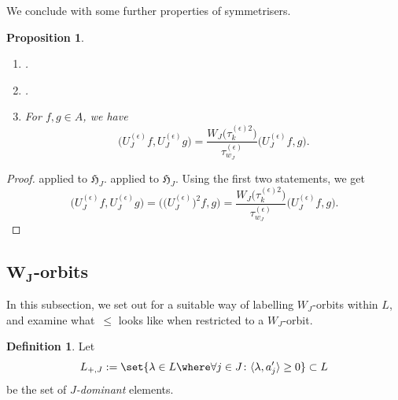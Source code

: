 \documentclass[pdftex]{sigma}
\newtheorem{Proposition}[Theorem]{Proposition}
\theoremstyle{definition}
\newtheorem{Definition}[Theorem]{Definition}
\numberwithin{equation}{section}
\begin{document}
We conclude with some further properties of symmetrisers.
\begin{Proposition}\label{sec:prop-symmetriser-properties}
\qquad
 \begin{enumerate}\itemsep=0pt
 \item[$(i)$] .\vspace{2mm}

 \item[$(ii)$] .
 \item[$(iii)$] For $f,g\in A$, we have
 \[
 \bigl(U^{(\epsilon)}_J f, U^{(\epsilon)}_Jg\bigr)
 = \frac{W_J\bigl(\tau^{(\epsilon)2}_k\bigr)}{\tau^{(\epsilon)}_{w_J}}
 \bigl(U^{(\epsilon)}_J f, g\bigr).
 \]
 \end{enumerate}
\end{Proposition}
\begin{proof} \cite[Section~5.5.17\,(ii)]{macdonald} applied
 to $\mathfrak{H}_J$.
 \cite[Section~5.5.17\,(iii)]{macdonald} applied to
 $\mathfrak{H}_J$.
Using the first two statements, we get
 \[
 \bigl(U^{(\epsilon)}_J f, U^{(\epsilon)}_J g\bigr)
 = \bigl(\bigl(U^{(\epsilon)}_J\bigr)^2 f, g\bigr)
 = \frac{W_J\bigl(\tau^{(\epsilon)2}_k\bigr)}{\tau^{(\epsilon)}_{w_J}}
 \bigl(U^{(\epsilon)}_J f, g\bigr).\tag*{\qed}
 \]
\renewcommand{\qed}{}
\end{proof}

\subsection[W\_J-orbits]{$\boldsymbol{ W_J}$-orbits}
In this subsection, we set out for a suitable way of labelling $W_J$-orbits within
$L$, and examine what~$\le$ looks like when restricted to a $W_J$-orbit.
\begin{Definition}
 Let
 \[
 L_{+,J} := \set{\lambda\in L\where\forall j\in J\colon \langle \lambda, a_j'\rangle\ge0} \subset L
 \]
 be the set of \emph{$J$-dominant} elements.
\end{Definition}
\end{document}

